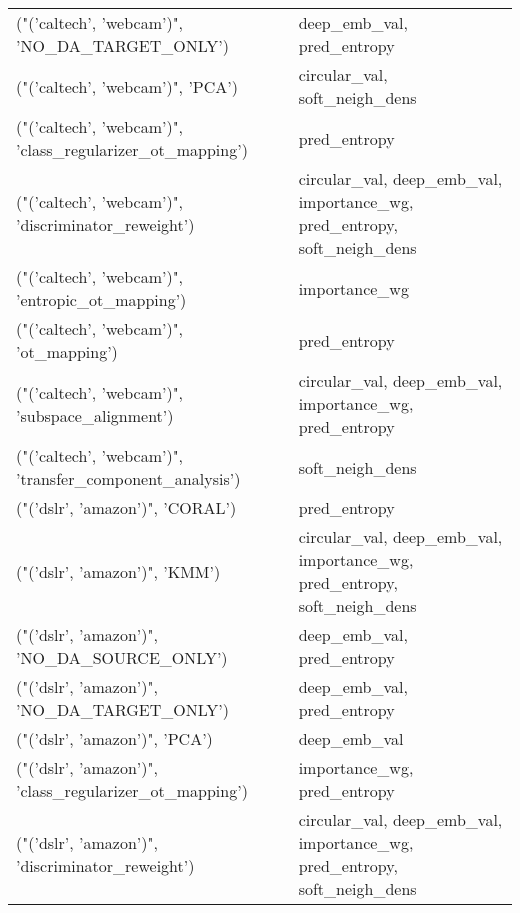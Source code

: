 \begin{tabular}{ll}
 ("('caltech', 'webcam')", 'NO\_DA\_TARGET\_ONLY')            & deep\_emb\_val, pred\_entropy                                               \\
 ("('caltech', 'webcam')", 'PCA')                          & circular\_val, soft\_neigh\_dens                                            \\
 ("('caltech', 'webcam')", 'class\_regularizer\_ot\_mapping') & pred\_entropy                                                             \\
 ("('caltech', 'webcam')", 'discriminator\_reweight')       & circular\_val, deep\_emb\_val, importance\_wg, pred\_entropy, soft\_neigh\_dens \\
 ("('caltech', 'webcam')", 'entropic\_ot\_mapping')          & importance\_wg                                                            \\
 ("('caltech', 'webcam')", 'ot\_mapping')                   & pred\_entropy                                                             \\
 ("('caltech', 'webcam')", 'subspace\_alignment')           & circular\_val, deep\_emb\_val, importance\_wg, pred\_entropy                  \\
 ("('caltech', 'webcam')", 'transfer\_component\_analysis')  & soft\_neigh\_dens                                                          \\
 ("('dslr', 'amazon')", 'CORAL')                           & pred\_entropy                                                             \\
 ("('dslr', 'amazon')", 'KMM')                             & circular\_val, deep\_emb\_val, importance\_wg, pred\_entropy, soft\_neigh\_dens \\
 ("('dslr', 'amazon')", 'NO\_DA\_SOURCE\_ONLY')               & deep\_emb\_val, pred\_entropy                                               \\
 ("('dslr', 'amazon')", 'NO\_DA\_TARGET\_ONLY')               & deep\_emb\_val, pred\_entropy                                               \\
 ("('dslr', 'amazon')", 'PCA')                             & deep\_emb\_val                                                             \\
 ("('dslr', 'amazon')", 'class\_regularizer\_ot\_mapping')    & importance\_wg, pred\_entropy                                              \\
 ("('dslr', 'amazon')", 'discriminator\_reweight')          & circular\_val, deep\_emb\_val, importance\_wg, pred\_entropy, soft\_neigh\_dens \\

\end{tabular}
